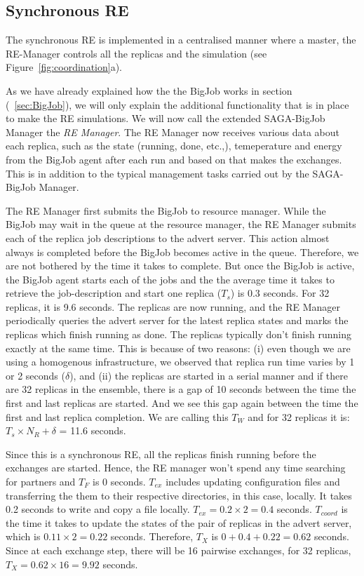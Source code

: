 \documentclass{rspublic}
\begin{document}
\subsection{Synchronous RE}

The synchronous RE is implemented in a centralised manner where a
master, the RE-Manager controls all the replicas and the simulation
(see Figure~\ref{fig:coordination}a). 

As we have already explained how the the BigJob works in section (~\ref{sec:BigJob}), we will only explain the additional functionality that is in place to make the RE simulations. We will now call the extended SAGA-BigJob Manager the \emph{RE Manager}. The RE Manager now receives various data about each replica, such as the state (running, done, etc.,), temeperature and energy from the BigJob agent after each run and based on that makes the exchanges. This is in addition to the typical management tasks carried out by the SAGA-BigJob Manager.

The RE Manager first submits the BigJob to resource manager. While the BigJob may wait in the queue at the resource manager, the RE Manager submits each of the replica job descriptions to the advert server. This action almost always is completed before the BigJob becomes active in the queue. Therefore, we are not bothered by the time it takes to complete. But once the BigJob is active, the BigJob agent starts each of the jobs and the the average time it takes to retrieve the job-description and start one replica ($T_s$) is 0.3 seconds. For 32 replicas, it is 9.6 seconds. The replicas are now running, and the RE Manager periodically queries the advert server for the latest replica states and marks the replicas which finish running as done. The replicas typically don't finish running exactly at the same time. This is because of two reasons: (i) even though we are using  a homogenous infrastructure, we observed that replica run time varies by 1 or 2 seconds ($\delta$), and (ii) the replicas are started in a serial manner and if there are 32 replicas in the ensemble, there is a gap of 10 seconds between the time the first and last replicas are started. And we see this gap again between the time the first and last replica completion. We are calling this $T_W$ and for 32 replicas it is: $T_s \times N_R+\delta$ = 11.6 seconds. 

Since this is a synchronous RE, all the replicas finish running before the exchanges are started. Hence, the RE manager won't spend any time searching for partners and $T_F$ is 0 seconds. $T_{ex}$ includes updating configuration files and transferring the them to their respective directories, in this case, locally. It takes 0.2 seconds to write and copy a file locally. $T_{ex} = 0.2 \times 2=0.4$ seconds. $T_{coord}$ is the time it takes to update the states of the pair of replicas in the advert server, which is $0.11\times 2 = 0.22$ seconds. Therefore, $T_X$ is $0+0.4+0.22=0.62$ seconds. Since at each exchange step, there will be 16 pairwise exchanges, for 32 replicas, $T_X=0.62 \times 16 = 9.92$ seconds.
\end{document}
